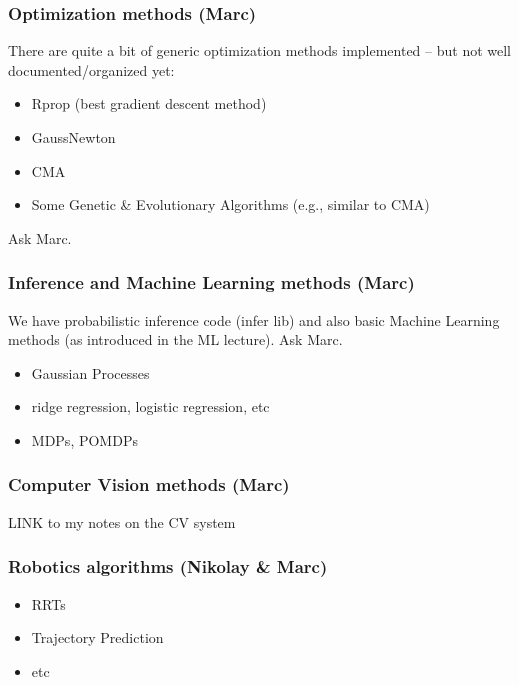 \subsubsection{Optimization methods (Marc)}

There are quite a bit of generic optimization methods implemented --
but not well documented/organized yet:

\begin{itemize}
\item Rprop (best gradient descent method)

\item GaussNewton

\item CMA

\item Some Genetic \& Evolutionary Algorithms (e.g., similar to CMA)
\end{itemize}

Ask Marc.



\subsubsection{Inference and Machine Learning methods (Marc)}

We have probabilistic inference code (infer lib) and also basic
Machine Learning methods (as introduced in the ML lecture). Ask Marc.

\begin{itemize}
\item Gaussian Processes

\item ridge regression, logistic regression, etc

\item MDPs, POMDPs
\end{itemize}



\subsubsection{Computer Vision methods (Marc)}

LINK to my notes on the CV system


\subsubsection{Robotics algorithms (Nikolay \& Marc)}

\begin{itemize}
\item RRTs

\item Trajectory Prediction

\item etc
\end{itemize}



